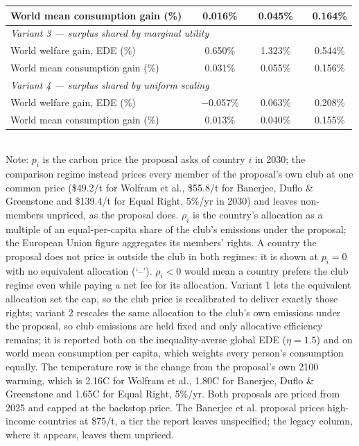 \begin{table}[htbp]
\begin{tabular}{lcccccc}
  \quad World mean consumption gain (\%) &  & 0.016\% &  & 0.045\% &  & 0.164\% \\
  \midrule
  \multicolumn{7}{l}{\textit{Variant 3 --- surplus shared by marginal utility}} \\
  \quad World welfare gain, EDE (\%) &  & 0.650\% &  & 1.323\% &  & 0.544\% \\
  \quad World mean consumption gain (\%) &  & 0.031\% &  & 0.055\% &  & 0.156\% \\
  \midrule
  \multicolumn{7}{l}{\textit{Variant 4 --- surplus shared by uniform scaling}} \\
  \quad World welfare gain, EDE (\%) &  & $-$0.057\% &  & 0.063\% &  & 0.208\% \\
  \quad World mean consumption gain (\%) &  & 0.013\% &  & 0.040\% &  & 0.155\% \\
  \bottomrule
\end{tabular}
\label{tab:equiv_rights_B}
\\[4pt]
{\footnotesize Note: $p_i$ is the carbon price the proposal asks of country $i$ in 2030; the comparison regime instead prices every member of the proposal's own club at one common price (\$49.2/t for Wolfram et al., \$55.8/t for Banerjee, Duflo \& Greenstone and \$139.4/t for Equal Right, 5\%/yr in 2030) and leaves non-members unpriced, as the proposal does. $\rho_i$ is the country's allocation as a multiple of an equal-per-capita share of the club's emissions under the proposal; the European Union figure aggregates its members' rights. A country the proposal does not price is outside the club in both regimes: it is shown at $p_i=0$ with no equivalent allocation (`--'). $\rho_i < 0$ would mean a country prefers the club regime even while paying a net fee for its allocation. Variant 1 lets the equivalent allocation set the cap, so the club price is recalibrated to deliver exactly those rights; variant 2 rescales the same allocation to the club's own emissions under the proposal, so club emissions are held fixed and only allocative efficiency remains; it is reported both on the inequality-averse global EDE ($\eta=1.5$) and on world mean consumption per capita, which weights every person's consumption equally. The temperature row is the change from the proposal's own 2100 warming, which is 2.16\textdegree{}C for Wolfram et al., 1.80\textdegree{}C for Banerjee, Duflo \& Greenstone and 1.65\textdegree{}C for Equal Right, 5\%/yr. Both proposals are priced from 2025 and capped at the backstop price. The Banerjee et al. proposal prices high-income countries at \$75/t, a tier the report leaves unspecified; the legacy column, where it appears, leaves them unpriced.}
\end{table}
